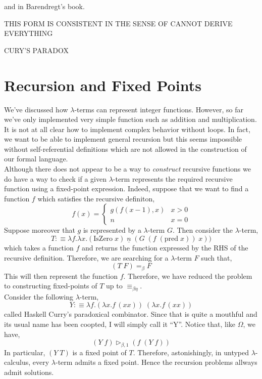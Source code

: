 \documentclass[12pt]{article}
\newcommand{\red}{\triangleright}
\newcommand{\bredo}{\red_{\beta,1}}
\begin{document}
and in Barendregt's book. 

THIS FORM IS CONSISTENT IN THE SENSE OF CANNOT DERIVE EVERYTHING

CURY'S PARADOX

\section{Recursion and Fixed Points}

We've discussed how $\lambda$-terms can represent integer functions. However, so far we've only implemented very simple function such as addition and multiplication. It is not at all clear how to implement complex behavior without loops. In fact, we want to be able to implement general recursion but this seems impossible without self-referential definitions which are not allowed in the construction of our formal language. 
\bigskip\\
Although there does not appear to be a way to \textit{construct} recursive functions we do have a way to check if a given $\lambda$-term represents the required recursive function using a fixed-point expression. Indeed, suppose that we want to find a function $f$ which satisfies the recursive definiton,
\[ f(x) = 
\begin{cases}
g(f(x-1), x) & x > 0
\\
n & x = 0
\end{cases}\]
Suppose moreover that $g$ is represented by a $\lambda$-term $G$. Then consider the $\lambda$-term,
\[ T :\equiv \lambda f . \lambda x . (\text{IsZero} \; x) \; \underline{n} \; (G \; (f \; (\text{pred} \; x)) \; x)) \]
which takes a function $f$ and returns the function expressed by the RHS of the recursive definition. Therefore, we are searching for a $\lambda$-term $F$ such that,
\[ (T \; F) =_\beta F \]
This will then represent the function $f$. Therefore, we have reduced the problem to constructing fixed-points of $T$ up to $\equiv_{\beta\eta}$.  
\bigskip\\
Consider the following $\lambda$-term,
\[ Y :\equiv \lambda f. (\lambda x. f \, (x x)) \; (\lambda x. f \, (x x)) \]
called Haskell Curry's paradoxical combinator. Since that is quite a mouthful and its usual name has been coopted, I will simply call it ``Y''. 
Notice that, like $\Omega$, we have,
\[ (Y \; f) \bredo (f \; (Y \; f)) \]
In particular, $(Y \; T)$ is a fixed point of $T$. Therefore, astonishingly, in untyped $\lambda$-calculus, every $\lambda$-term admits a fixed point. Hence the recursion problems allways admit solutions. 
\end{document}
